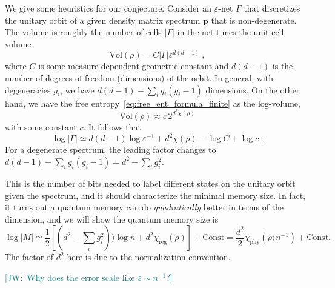 \documentclass[11pt,letterpaper]{article}
\def\eps{\varepsilon}
\newcommand{\JW}[1]{\textcolor{teal}{[JW:\ #1]}}
\begin{document}
We give some heuristics for our conjecture. Consider an $\eps$-net $\Gamma$ that discretizes the unitary orbit of a given density matrix spectrum $\mathbf{p}$ that is non-degenerate. The volume is roughly the number of cells $|\Gamma|$ in the net times the unit cell volume
\begin{equation}
    \mathrm{Vol}(\rho)=C |\Gamma| \eps^{d(d-1)}\ ,
\end{equation}
where $C$ is some measure-dependent geometric constant and $d(d-1)$ is the number of degrees of freedom (dimensions) of the orbit. In general, with degeneracies $g_i$, we have $d(d-1)-\sum_i g_i(g_i-1)$ dimensions. On the other hand, we have the free entropy~\eqref{eq:free_ent_formula_finite} as the log-volume,
\begin{equation}
    \mathrm{Vol}(\rho) \approx c\, 2^{d^2\chi(\rho)}
\end{equation}
with some constant $c$. It follows that 
\begin{equation}
    \log|\Gamma| \simeq d(d-1)\log\eps^{-1} +d^2\chi(\rho) - \log C+\log c\ .
\end{equation}
For a degenerate spectrum, the leading factor changes to $d(d-1)-\sum_i g_i(g_i-1)=d^2-\sum_i g_i^2$.


This is the number of bits needed to label different states on the unitary orbit given the spectrum, and it should characterize the minimal memory size. In fact, it turns out a quantum memory can do \emph{quadratically} better in terms of the dimension, and we will show the quantum memory size is 
\begin{equation}
    \log |M| \simeq \frac12\left[(d^2-\sum_i g_i^2))\log n +d^2\chi_\mathrm{reg}(\rho)\right] + \mathrm{Const}=\frac{d^2}{2}\chi_\mathrm{phy}(\rho;n^{-1}) + \mathrm{Const}.
\end{equation}
The factor of $d^2$ here is due to the normalization convention.

\JW{Why does the error scale like $\eps\sim n^{-1}$?}


\end{document}
